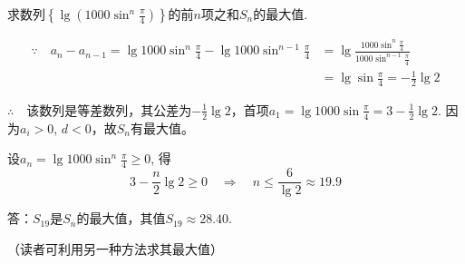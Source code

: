 \begin{example}
    求数列$\left\{\lg\left(1000\sin^n\frac{\pi}{4}\right)\right\}$的前$n$项之和$S_n$的最大值.
\end{example}

\begin{solution}
\[\begin{split}
\because\quad a_n-a_{n-1}=\lg1000\sin^n\frac{\pi}{4}-\lg1000\sin^{n-1}\frac{\pi}{4}   
&=\lg\frac{1000\sin^n\frac{\pi}{4}}{1000\sin^{n-1}\frac{\pi}{4}}\\
&=\lg\sin\frac{\pi}{4}=-\frac{1}{2}\lg 2
\end{split}\]

$\therefore\quad $该数列是等差数列，其公差为$-\frac{1}{2}\lg 2$，首项$a_1=\lg1000 \sin\frac{\pi}{4}=3-\frac{1}{2}\lg2$. 因为$a_i>0$, $d<0$，故$S_n$有最大值。

设$a_n=\lg 1000\sin^n\frac{\pi}{4}\ge 0$, 得
\[3-\frac{n}{2}\lg2\ge 0\quad \Rightarrow\quad n\le \frac{6}{\lg 2}\approx 19.9\]

答：$S_{19}$是$S_n$的最大值，其值$S_{19}\approx 28.40$.

（读者可利用另一种方法求其最大值）
\end{solution}

